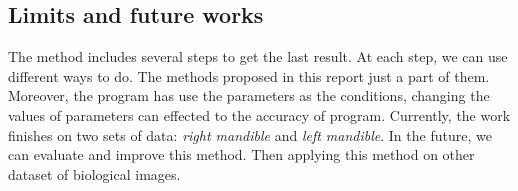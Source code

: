\subsection{Limits and future works}
The method includes several steps to get the last result. At each step, we can use different ways to do. The methods proposed in this report just a part of them. Moreover, the program has use the parameters as the conditions, changing the values of parameters can effected to the accuracy of program.
Currently, the work finishes on two sets of data: \textit{right mandible} and \textit{left mandible}. In the future, we can evaluate and improve this method. Then applying this method on other dataset of biological images.
